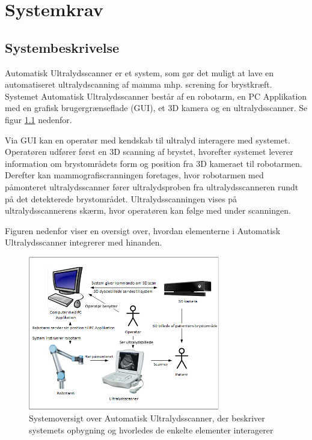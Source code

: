 \chapter{Systemkrav}\label{Systemkrav}
\section{Systembeskrivelse}
Automatisk Ultralydsscanner er et system, som gør det muligt at lave en automatiseret ultralydscanning af mamma mhp. screning for brystkræft. Systemet Automatisk Ultralydsscanner består af en robotarm, en PC Applikation med en grafisk brugergrænseflade (GUI), et 3D kamera og en ultralydsscanner. Se figur \ref{Systembeskrivelse} nedenfor. 

Via GUI kan en operatør med kendskab til ultralyd interagere med systemet. Operatøren udfører først en 3D scanning af brystet, hvorefter systemet leverer information om brystområdets form og position fra 3D kameraet til robotarmen. Derefter kan mammografiscranningen foretages, hvor robotarmen med påmonteret ultralydsscanner fører ultralydsproben fra ultralydsscanneren rundt på det detekterede brystområdet. Ultralydsscanningen vises på ultralydsscannerens skærm, hvor operatøren kan følge med under scanningen.

Figuren nedenfor viser en oversigt over, hvordan elementerne i Automatisk Ultralydsscanner integrerer med hinanden.
 
\begin{figure}[H]
    \centering
    \includegraphics[width=0.75\textwidth]{figurer/d/Kravspecifikation/Systembeskrivelse}
    \caption{Systemoversigt over Automatisk Ultralydsscanner, der beskriver systemets opbygning og hvorledes de enkelte elementer interagerer}
    \label{Systembeskrivelse}
\end{figure}

